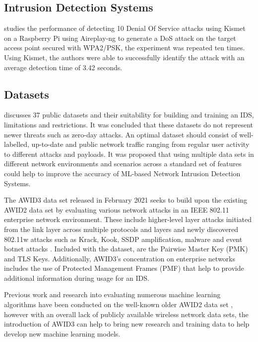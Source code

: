 \subsection{Intrusion Detection Systems}

\textcite{10.4108/eai.27-11-2021.2315535} studies the performance of detecting 10 Denial Of Service attacks using Kismet on a Raspberry Pi using Aireplay-ng to generate a DoS attack on the target access point secured with WPA2/PSK, the experiment was repeated ten times. Using Kismet, the authors were able to successfully identify the attack with an average detection time of 3.42 seconds.

\subsection{Datasets}

\cite{9664737} discusses 37 public datasets and their suitability for building and training an IDS, limitations and restrictions. It was concluded that these datasets do not represent newer threats such as zero-day attacks. An optimal dataset should consist of well-labelled, up-to-date and public network traffic ranging from regular user activity to different attacks and payloads. It was proposed that using multiple data sets in different network environments and scenarios across a standard set of features could help to improve the accuracy of ML-based Network Intrusion Detection Systems.

\medskip

The AWID3 data set \parencite{9360747} released in February 2021 seeks to build upon the existing AWID2 data set by evaluating various network attacks in an IEEE 802.11 enterprise network environment. These include higher-level layer attacks initiated from the link layer across multiple protocols and layers and newly discovered 802.11w attacks such as Krack, Kook, SSDP amplification, malware and event botnet attacks \parencite{kolias2015intrusion}. Included with the dataset, are the Pairwise Master Key (PMK) and TLS Keys. Additionally, AWID3's concentration on enterprise networks includes the use of Protected Management Frames (PMF) that help to provide additional information during usage for an IDS. 

Previous work and research into evaluating numerous machine learning algorithms have been conducted on the well-known older AWID2 data set \parencite{kolias2015intrusion}, however with an overall lack of publicly available wireless network data sets, the introduction of AWID3 can help to bring new research and training data to help develop new machine learning models.  

